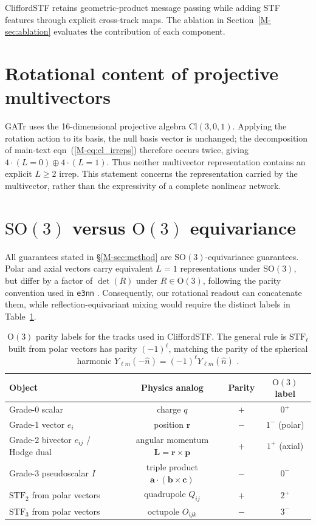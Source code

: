 CliffordSTF retains geometric-product message passing while adding STF features through explicit cross-track maps. The ablation in Section~\ref{M-sec:ablation} evaluates the contribution of each component.

\section{Rotational content of projective multivectors}\label{supp:gatr}

GATr \citep{brehmer2023geometric} uses the 16-dimensional projective algebra $\mathrm{Cl}(3,0,1)$. Applying the rotation action to its basis, the null basis vector is unchanged; the decomposition of main-text eqn~(\ref{M-eq:cl_irreps}) therefore occurs twice, giving $4\cdot(L{=}0)\oplus4\cdot(L{=}1)$. Thus neither multivector representation contains an explicit $L{\geq}2$ irrep. This statement concerns the representation carried by the multivector, rather than the expressivity of a complete nonlinear network.

\section{\texorpdfstring{$\mathrm{SO}(3)$}{SO(3)} versus \texorpdfstring{$\mathrm{O}(3)$}{O(3)} equivariance}\label{supp:so3_o3}

All guarantees stated in \S\ref{M-sec:method} are $\mathrm{SO}(3)$-equivariance guarantees. Polar and axial vectors carry equivalent $L{=}1$ representations under $\mathrm{SO}(3)$, but differ by a factor of $\det(R)$ under $R\in\mathrm{O}(3)$, following the parity convention used in \texttt{e3nn} \citep{geiger2022e3nn}. Consequently, our rotational readout can concatenate them, while reflection-equivariant mixing would require the distinct labels in Table~\ref{tab:parity}.

\begin{table}[!htbp]
\centering
\caption{$\mathrm{O}(3)$ parity labels for the tracks used in CliffordSTF. The general rule is $\mathrm{STF}_\ell$ built from polar vectors has parity $(-1)^\ell$, matching the parity of the spherical harmonic $Y_{\ell m}(-\hat{n}) = (-1)^\ell Y_{\ell m}(\hat{n})$ \citep{varshalovich1988quantum}.}\label{tab:parity}
\small
\begin{tabular}{lccc}
\toprule
Object & Physics analog & Parity & $\mathrm{O}(3)$ label \\
\midrule
Grade-0 scalar & charge $q$ & $+$ & $0^+$ \\
Grade-1 vector $e_i$ & position $\mathbf{r}$ & $-$ & $1^-$ (polar) \\
Grade-2 bivector $e_{ij}$ / Hodge dual & angular momentum $\mathbf{L}{=}\mathbf{r}\times\mathbf{p}$ & $+$ & $1^+$ (axial) \\
Grade-3 pseudoscalar $I$ & triple product $\mathbf{a}\cdot(\mathbf{b}\times\mathbf{c})$ & $-$ & $0^-$ \\
$\mathrm{STF}_2$ from polar vectors & quadrupole $Q_{ij}$ & $+$ & $2^+$ \\
$\mathrm{STF}_3$ from polar vectors & octupole $O_{ijk}$ & $-$ & $3^-$ \\
\bottomrule
\end{tabular}
\end{table}

